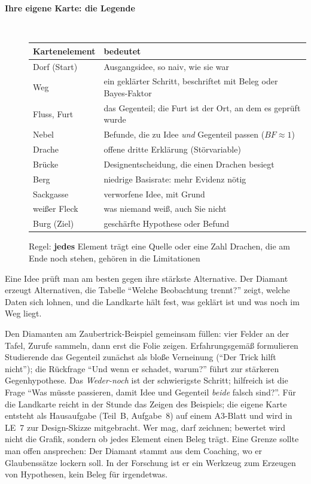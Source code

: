 \begin{description}
\item[{\rot\bf Ihre eigene Karte: die Legende}]~\\[-\lblskip]
\begin{center}
\small
\begin{tabular}{@{}p{}p{}@{}}
\toprule
\textbf{Kartenelement} & \textbf{bedeutet} \\
\midrule
Dorf (Start) & Ausgangsidee, so naiv, wie sie war \\
Weg & ein geklärter Schritt, beschriftet mit Beleg oder Bayes-Faktor \\
Fluss, Furt & das Gegenteil; die Furt ist der Ort, an dem es geprüft wurde \\
Nebel & Befunde, die zu Idee \emph{und} Gegenteil passen ($\mathit{BF}\approx1$) \\
Drache & offene dritte Erklärung (Störvariable) \\
Brücke & Designentscheidung, die einen Drachen besiegt \\
Berg & niedrige Basisrate: mehr Evidenz nötig \\
Sackgasse & verworfene Idee, mit Grund \\
weißer Fleck & was niemand weiß, auch Sie nicht \\
Burg (Ziel) & geschärfte Hypothese oder Befund \\
\bottomrule
\end{tabular}
\end{center}
\bi
  \ite Regel: \textbf{jedes} Element trägt eine Quelle oder eine Zahl
  \ite Drachen, die am Ende noch stehen, gehören in die Limitationen
\ei
\os{\newpage}
\end{description}

\begin{merkbox}
Eine Idee prüft man am besten gegen ihre stärkste Alternative. Der
Diamant erzeugt Alternativen, die Tabelle \enquote{Welche Beobachtung
trennt?} zeigt, welche Daten sich lohnen, und die Landkarte hält fest,
was geklärt ist und was noch im Weg liegt.
\end{merkbox}
\os{\newpage}

\begin{lehrhinweis}
Den Diamanten am Zaubertrick-Beispiel gemeinsam füllen: vier Felder an
der Tafel, Zurufe sammeln, dann erst die Folie zeigen. Erfahrungsgemäß
formulieren Studierende das Gegenteil zunächst als bloße Verneinung
(\enquote{Der Trick hilft nicht}); die Rückfrage \enquote{Und wenn er
schadet, warum?} führt zur stärkeren Gegenhypothese. Das
\emph{Weder-noch} ist der schwierigste Schritt; hilfreich ist die Frage
\enquote{Was müsste passieren, damit Idee und Gegenteil \emph{beide}
falsch sind?}. Für die Landkarte reicht in der Stunde das Zeigen des
Beispiels; die eigene Karte entsteht als Hausaufgabe (Teil~B,
Aufgabe~8) auf einem A3-Blatt und wird in LE~7 zur Design-Skizze
mitgebracht. Wer mag, darf zeichnen; bewertet wird nicht die Grafik,
sondern ob jedes Element einen Beleg trägt. Eine Grenze sollte man
offen ansprechen: Der Diamant stammt aus dem Coaching, wo er
Glaubenssätze lockern soll. In der Forschung ist er ein Werkzeug zum
Erzeugen von Hypothesen, kein Beleg für irgendetwas.
\end{lehrhinweis}

